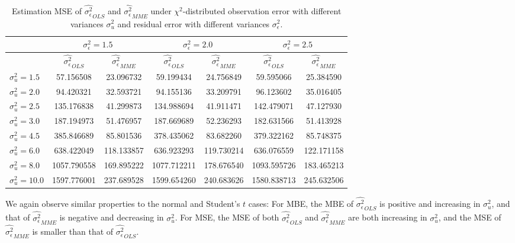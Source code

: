 \documentclass{article}
\begin{document}
\begin{table}[ht]
    \centering
    \caption{Estimation MSE of $\hat{\sigma^2_\epsilon}_{OLS}$ and $\hat{\sigma^2_\epsilon}_{MME}$ under $\chi^2$-distributed observation error with different variances $\sigma^2_u$ and residual error with different variances $\sigma^2_\epsilon$.}
    \label{Tab:MSE_sigma_chi}
    \begin{tabular}[t]{lcccccc}
        \hline
        &\multicolumn{2}{c}{$\sigma^2_\epsilon=1.5$}&\multicolumn{2}{c}{$\sigma^2_\epsilon=2.0$}&\multicolumn{2}{c}{$\sigma^2_\epsilon=2.5$}\\
        \hline
        &$\hat{\sigma^2_\epsilon}_{OLS}$&$\hat{\sigma^2_\epsilon}_{MME}$&$\hat{\sigma^2_\epsilon}_{OLS}$&
        $\hat{\sigma^2_\epsilon}_{MME}$&$\hat{\sigma^2_\epsilon}_{OLS}$&$\hat{\sigma^2_\epsilon}_{MME}$\\
        \hline
        $\sigma^2_u = 1.5$&57.156508&23.096732&59.199434&24.756849&59.595066&25.384590\\
        $\sigma^2_u = 2.0$&94.420321&32.593721&94.155136&33.209791&96.123602&35.016405\\
        $\sigma^2_u = 2.5$&135.176838&41.299873&134.988694&41.911471&142.479071&47.127930\\
        $\sigma^2_u = 3.0$&187.194973&51.476957&187.669689&52.236293&182.631566&51.413928\\
        $\sigma^2_u = 4.5$&385.846689&85.801536&378.435062&83.682260&379.322162&85.748375\\
        $\sigma^2_u = 6.0$&638.422049&118.133857&636.923293&119.730214&636.076559&122.171158\\
        $\sigma^2_u = 8.0$&1057.790558&169.895222&1077.712211&178.676540&1093.595726&183.465213\\
        $\sigma^2_u = 10.0$&1597.776001&237.689528&1599.654260&240.683626&1580.838713&245.632506\\
        \hline
    \end{tabular}
\end{table}

We again observe similar properties to the normal and Student's $t$ cases:
For MBE, the MBE of $\hat{\sigma^2_\epsilon}_{OLS}$ is positive and increasing in $\sigma^2_u$,
and that of $\hat{\sigma^2_\epsilon}_{MME}$ is negative and decreasing in $\sigma^2_u$. 
For MSE, the MSE of both $\hat{\sigma^2_\epsilon}_{OLS}$ and $\hat{\sigma^2_\epsilon}_{MME}$ are both increasing in $\sigma^2_u$, and the MSE of $\hat{\sigma^2_\epsilon}_{MME}$ is smaller than that of $\hat{\sigma^2_\epsilon}_{OLS}$. 
\end{document}
